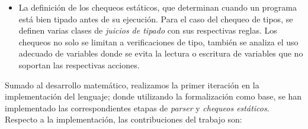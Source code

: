\begin{itemize}
\item
La definición de los chequeos estáticos, que determinan cuando un programa está bien tipado antes de su ejecución.
Para el caso del chequeo de tipos, se definen varias clases de \textit{juicios de tipado} con sus respectivas reglas.
Los chequeos no solo se limitan a verificaciones de tipo, también se analiza el uso adecuado de variables donde se evita la lectura o escritura de variables que no soportan las respectivas acciones.
\end{itemize}

Sumado al desarrollo matemático, realizamos la primer iteración en la implementación del lenguaje; donde utilizando la formalización como base, se han implementado las correspondientes etapas de \textit{parser} y \textit{chequeos estáticos}.
Respecto a la implementación, las contribuciones del trabajo son:

